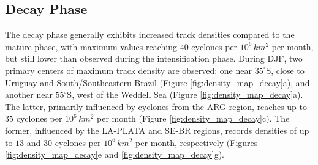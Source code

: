 \subsection{Decay Phase} \label{sec:decay_phase}


The decay phase generally exhibits increased track densities compared to the mature phase, with maximum values reaching \(40\) cyclones per \(10^6 \, km^2\) per month, but still lower than observed during the intensification phase. During DJF, two primary centers of maximum track density are observed: one near \(35^\circ\)S, close to Uruguay and South/Southeastern Brazil (Figure \ref{fig:density_map_decay}a), and another near \(55^\circ\)S, west of the Weddell Sea (Figure \ref{fig:density_map_decay}a). The latter, primarily influenced by cyclones from the ARG region, reaches up to \(35\) cyclones per \(10^6 \, km^2\) per month (Figure \ref{fig:density_map_decay}c). The former, influenced by the LA-PLATA and SE-BR regions, records densities of up to \(13\) and \(30\) cyclones per \(10^6 \, km^2\) per month, respectively (Figures \ref{fig:density_map_decay}e and \ref{fig:density_map_decay}g).


